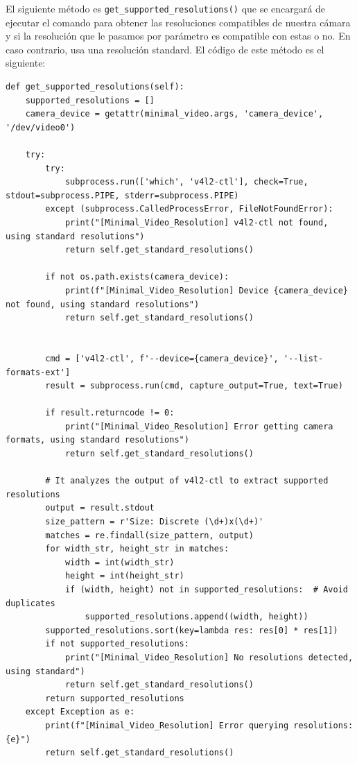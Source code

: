 El siguiente método es \texttt{get\_supported\_resolutions()} que se encargará de ejecutar el comando para obtener las resoluciones compatibles de nuestra cámara y si la resolución que le pasamos por parámetro es compatible con estas o no. En caso contrario, usa una resolución standard. El código de este método es el siguiente:
\begin{lstlisting}[style=pythonstyle, caption={\texttt{get\_supported\_resolutions()} de \textit{Minimal\_Video\_Resolution}.}, label={lst:get_supported_resolution_minimal_video_resolution}]
def get_supported_resolutions(self):
    supported_resolutions = []
    camera_device = getattr(minimal_video.args, 'camera_device', '/dev/video0')
    
    try:
        try:
            subprocess.run(['which', 'v4l2-ctl'], check=True, stdout=subprocess.PIPE, stderr=subprocess.PIPE)
        except (subprocess.CalledProcessError, FileNotFoundError):
            print("[Minimal_Video_Resolution] v4l2-ctl not found, using standard resolutions")
            return self.get_standard_resolutions()
            
        if not os.path.exists(camera_device):
            print(f"[Minimal_Video_Resolution] Device {camera_device} not found, using standard resolutions")
            return self.get_standard_resolutions()
        
        
        cmd = ['v4l2-ctl', f'--device={camera_device}', '--list-formats-ext']
        result = subprocess.run(cmd, capture_output=True, text=True)
        
        if result.returncode != 0:
            print("[Minimal_Video_Resolution] Error getting camera formats, using standard resolutions")
            return self.get_standard_resolutions()
        
        # It analyzes the output of v4l2-ctl to extract supported resolutions
        output = result.stdout
        size_pattern = r'Size: Discrete (\d+)x(\d+)'
        matches = re.findall(size_pattern, output)
        for width_str, height_str in matches:
            width = int(width_str)
            height = int(height_str)
            if (width, height) not in supported_resolutions:  # Avoid duplicates
                supported_resolutions.append((width, height))
        supported_resolutions.sort(key=lambda res: res[0] * res[1])
        if not supported_resolutions:
            print("[Minimal_Video_Resolution] No resolutions detected, using standard")
            return self.get_standard_resolutions()
        return supported_resolutions
    except Exception as e:
        print(f"[Minimal_Video_Resolution] Error querying resolutions: {e}")
        return self.get_standard_resolutions()
\end{lstlisting}
\vspace{\baselineskip}

